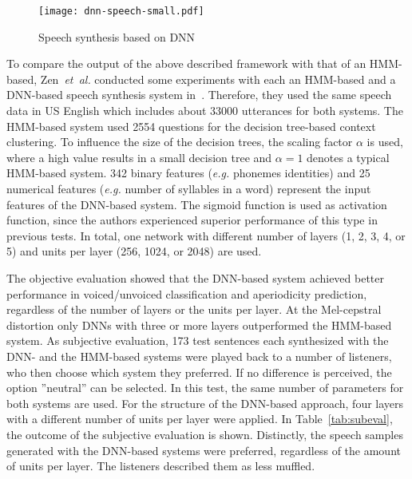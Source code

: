 \begin{figure}[h]
	\texttt{[image: dnn-speech-small.pdf]}
	\caption{Speech synthesis based on \ac{DNN}~\cite{zen:deepstatistical}}
	\label{fig:dnnspeech}
\end{figure}

To compare the output of the above described framework with that of an \ac{HMM}-based, Zen~\textit{et~al.} conducted some experiments with each an \ac{HMM}-based and a \ac{DNN}-based speech synthesis system in~\cite{zen:deepstatistical}. Therefore, they used the same speech data in US English which includes about 33000 utterances for both systems. The \ac{HMM}-based system used 2554 questions for the decision tree-based context clustering. To influence the size of the decision trees, the scaling factor $\alpha$ is used, where a high value results in a small decision tree and $\alpha = 1$ denotes a typical \ac{HMM}-based system. 342 binary features (\textit{e.g.} phonemes identities) and 25 numerical features (\textit{e.g.} number of syllables in a word) represent the input features of the \ac{DNN}-based system. The sigmoid function is used as activation function, since the authors experienced superior performance of this type in previous tests. In total, one network with different number of layers (1, 2, 3, 4, or 5) and units per layer (256, 1024, or 2048) are used.

The objective evaluation showed that the \ac{DNN}-based system achieved better performance in voiced/unvoiced classification and aperiodicity prediction, regardless of the number of layers or the units per layer. At the Mel-cepstral distortion only \acp{DNN} with three or more layers outperformed the \ac{HMM}-based system. 
As subjective evaluation, 173 test sentences each synthesized with the \ac{DNN}- and the \ac{HMM}-based systems were played back to a number of listeners, who then choose which system they preferred. If no difference is perceived, the option ''neutral'' can be selected. In this test, the same number of parameters for both systems are used. For the structure of the \ac{DNN}-based approach, four layers with a different number of units per layer were applied. In Table~\ref{tab:subeval}, the outcome of the subjective evaluation is shown. Distinctly, the speech samples generated with the \ac{DNN}-based systems were preferred, regardless of the amount of units per layer. The listeners described them as less muffled.

